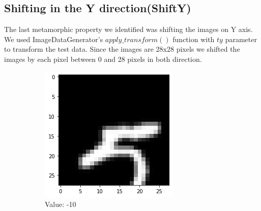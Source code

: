 \subsection{Shifting in the Y direction(ShiftY)}
The last metamorphic property we identified was shifting the images on Y axis. We used ImageDataGenerator's $apply\_transform()$ function with $ty$ parameter to transform the test data. Since the images are 28x28 pixels we shifted the images by each pixel between 0 and 28 pixels in both direction. 
    \begin{figure}[htb!]
        \centering
        \begin{subfigure}[b]{.3\textwidth}
            \centering
            \includegraphics[width=\linewidth]{images/shifty1.png}
            \caption{Value: -10}
            \label{fig:Rotate-misclass0}
        \end{subfigure}%
        \begin{subfigure}[b]{.3\textwidth}
            \centering

\end{subfigure}
\end{figure}
